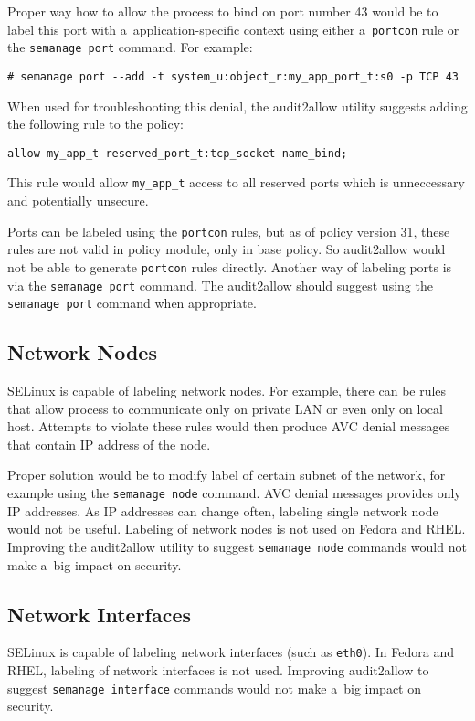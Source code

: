 Proper way how to allow the process to bind on port number 43 would be to label
this port with a~application-specific context using either a~\texttt{portcon}
rule or the \texttt{semanage port} command. For example:
\begin{lstlisting}
# semanage port --add -t system_u:object_r:my_app_port_t:s0 -p TCP 43
\end{lstlisting}

When used for troubleshooting this denial, the audit2allow utility suggests
adding the following rule to the policy:
\begin{lstlisting}[language=te]
allow my_app_t reserved_port_t:tcp_socket name_bind;
\end{lstlisting}
This rule would allow \texttt{my\_app\_t} access to all reserved ports which is
unneccessary and potentially unsecure.

Ports can be labeled using the \texttt{portcon} rules, but as of policy version
31, these rules are not valid in policy module, only in base policy. So
audit2allow would not be able to generate \texttt{portcon} rules directly.
Another way of labeling ports is via the \texttt{semanage port} command. The
audit2allow should suggest using the \texttt{semanage port} command when
appropriate.

\subsection{Network Nodes}
SELinux is capable of labeling network nodes. For example, there can be rules
that allow process to communicate only on private LAN or even only on local
host. Attempts to violate these rules would then produce AVC denial messages
that contain IP address of the node.

Proper solution would be to modify label of certain subnet of the network, for
example using the \texttt{semanage node} command. AVC denial messages provides
only IP addresses. As IP addresses can change often, labeling single network
node would not be useful. Labeling of network nodes is not used on Fedora and
RHEL. Improving the audit2allow utility to suggest \texttt{semanage node}
commands would not make a~big impact on security.

\subsection{Network Interfaces}
SELinux is capable of labeling network interfaces (such as \texttt{eth0}). In
Fedora and RHEL, labeling of network interfaces is not used. Improving
audit2allow to suggest \texttt{semanage interface} commands would not make a~big
impact on security.

